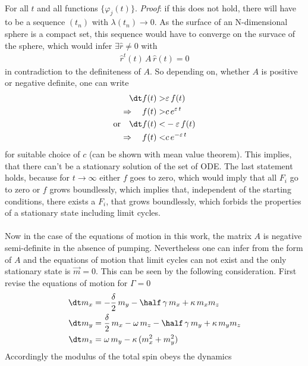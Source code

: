 \begin{appendices}
\begin{align*}
    \end{align*}
    For all $t$ and all functions $\{\varphi_j(t)\}$. \textit{Proof}: if this does not hold, there will have to be a sequence $(t_n)$ with $\lambda(t_n)\rightarrow0$. As the surface of an N-dimensional sphere is a compact set, this sequence would have to converge on the survace of the sphere, which would infer $\exists \hat{r}\neq0$ with 
    \begin{align*}
        \hat{r}^t(t)\,A\,\hat{r}(t)=0
    \end{align*}
    in contradiction to the definiteness of $A$. So depending on, whether $A$ is positive or negative definite, one can write
    \begin{align*}
        \dt f(t) >& \varepsilon\,f(t)\\
        \Rightarrow\quad f(t) >& c\,e^{\varepsilon\,t}\\
        \text{or}\quad \dt f(t) <& -\varepsilon\,f(t)\\
        \Rightarrow\quad f(t) <& c\,e^{-\varepsilon\,t}\\
    \end{align*}
    for suitable choice of $c$ (can be shown with mean value theorem). This implies, that there can't be a stationary solution of the set of ODE. The last statement holds, because for $t\rightarrow\infty$ either $f$ goes to zero, which would imply that all $F_i$ go to zero or $f$ grows boundlessly, which implies that, independent of the starting conditions, there exists a $F_i$, that grows boundlessly, which forbids the properties of a stationary state including limit cycles.\\\\Now in the case of the equations of motion in this work, the matrix $A$ is negative semi-definite in the absence of pumping. Nevertheless one can infer from the form of $A$ and the equations of motion that limit cycles can not exist and the only stationary state is $\vec{m}=0$. This can be seen by the following consideration. First revise the equations of motion for $\Gamma=0$
    \begin{align*}
        \dt m_x &= -\frac{\delta}{2}\,m_y-\half\,\gamma\,m_x+\kappa\,m_x m_z\\
        \dt m_y &= \frac{\delta}{2}\,m_x-\omega\,m_z-\half\,\gamma\,m_y+\kappa\,m_y m_z\\
        \dt m_z &= \omega\,m_y - \kappa\,(m_x^2+m_y^2)
    \end{align*}
    Accordingly the modulus of the total spin obeys the dynamics
    \begin{align*}

\end{align*}
\end{appendices}
